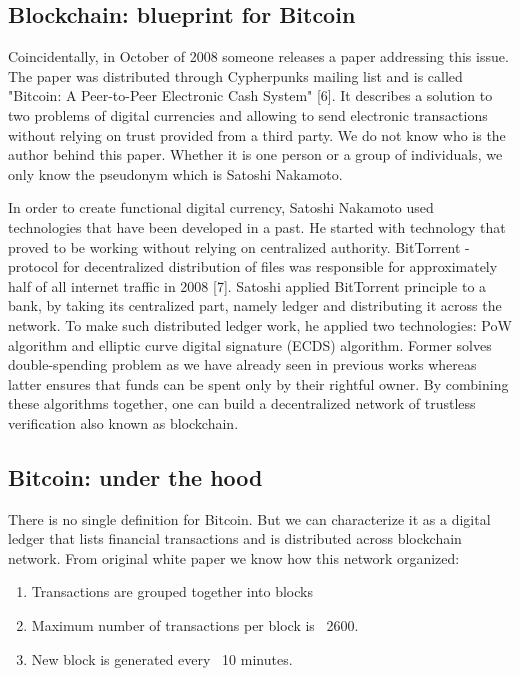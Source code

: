 \documentclass[conference,compsoc]{IEEEtran}
\begin{document}
\subsection{Blockchain: blueprint for Bitcoin}
Coincidentally, in October of 2008 someone releases a paper addressing this issue. 
The paper was distributed through Cypherpunks mailing list and is called "Bitcoin: A Peer-to-Peer Electronic Cash System" [6]. 
It describes a solution to two problems of digital currencies and allowing to send electronic transactions without relying on trust provided from a third party. 
We do not know who is the author behind this paper. 
Whether it is one person or a group of individuals, we only know the pseudonym which is Satoshi Nakamoto.    

In order to create functional digital currency, Satoshi Nakamoto used technologies that have been developed in a past. 
He started with technology that proved to be working without relying on centralized authority.    
BitTorrent - protocol for decentralized distribution of files was responsible for approximately half of all internet traffic in 2008 [7]. 
Satoshi applied BitTorrent principle to a bank, by taking its centralized part, namely ledger and distributing it across the network. 
To make such distributed ledger work, he applied two technologies: PoW algorithm and elliptic curve digital signature (ECDS) algorithm.
Former solves double-spending problem as we have already seen in previous works whereas latter ensures that funds can be spent only by their rightful owner.
By combining these algorithms together, one can build a decentralized network of trustless verification also known as blockchain. 

\subsection{Bitcoin: under the hood}
There is no single definition for Bitcoin.
But we can characterize it as a digital ledger that lists financial transactions and is distributed across blockchain network. 
From original white paper we know how this network organized: 

\begin{enumerate}
  \item Transactions are grouped together into blocks 
  \item Maximum number of transactions per block is ~2600. 
  \item New block is generated every ~10 minutes.
\end{enumerate}
\end{document}
